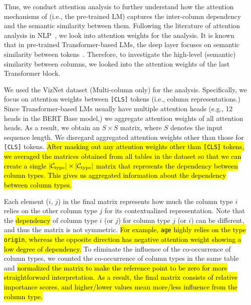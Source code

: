 Thus, we conduct attention analysis to further understand how the attention mechanisms of \name{} (i.e., the pre-trained LM) captures the inter-column dependency and the semantic similarity between them.
%
Following the literature of attention analysis in NLP~\cite{Clark:2019:WhatDoesBERTLookAt,tenney-etal-2019-bert-rediscovers,Rogers:2020:TACL:BERTology}, we look into attention weights for the analysis.
%
It is known that in pre-trained Transformer-based LMs, 
%
the deep layer focuses on semantic similarity between tokens~\cite{Clark:2019:WhatDoesBERTLookAt,tenney-etal-2019-bert-rediscovers}.
%
Therefore, to investigate the high-level (semantic) similarity between columns, we looked into the attention weights of the last Transformer block. 
%

We used the VizNet dataset (Multi-column only) for the analysis.
%
Specifically, we focus on attention weights between {\tt [CLS]} tokens (i.e., column representations.) 
%
Since Transformer-based LMs usually have multiple attention heads (e.g., 12 heads in the BERT Base model,) we aggregate attention weights of all attention heads. As a result, we obtain an $S \times S$ matrix, where $S$ denotes the input sequence length.
%
We disregard aggregated attention weights other than those for {\tt [CLS]} tokens.
%
\hl{After masking out any attention weights other than {\tt [CLS]} tokens, we averaged the matrices obtained from all tables in the dataset so that we can create a single $|\mathcal{C}_{\rm type}| \times |\mathcal{C}_{\rm type}|$ matrix that represents the dependency between column types. This gives us aggregated information about the dependency between column types.}


Each element ($i$, $j$) in the final matrix represents how much the column type $i$ relies on the other column type $j$ for its contextualized representation.
%
Note that the \hl{dependency} of column type $i$ (or $j$) for column type $j$ (or $i$) can be different, and thus the matrix is not symmetric. \hl{For example, {\tt age} highly relies on the type {\tt origin}, whereas the opposite direction has negative attention weight showing a low degree of dependency.}
%
To eliminate the influence of the co-occurrence of column types, we counted the co-occurrence of column types in the same table and \hl{normalized the matrix to make the reference point to be zero for more straightforward interpretation.
%
As a result, the final matrix consists of relative importance scores, and higher/lower values mean more/less influence from the column type.}
%



